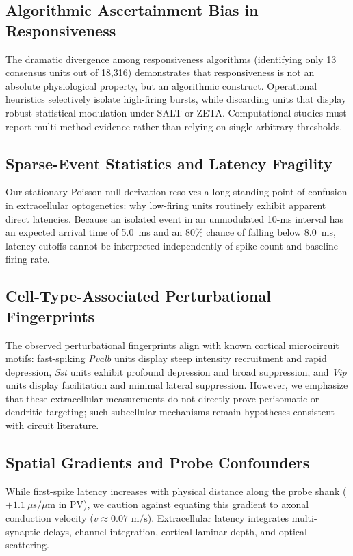 \documentclass[10pt,journal,compsoc]{IEEEtran}
\begin{document}
\subsection{Algorithmic Ascertainment Bias in Responsiveness}
The dramatic divergence among responsiveness algorithms (identifying only 13 consensus units out of 18,316) demonstrates that responsiveness is not an absolute physiological property, but an algorithmic construct. Operational heuristics selectively isolate high-firing bursts, while discarding units that display robust statistical modulation under SALT or ZETA. Computational studies must report multi-method evidence rather than relying on single arbitrary thresholds.

\subsection{Sparse-Event Statistics and Latency Fragility}
Our stationary Poisson null derivation resolves a long-standing point of confusion in extracellular optogenetics: why low-firing units routinely exhibit apparent direct latencies. Because an isolated event in an unmodulated 10-ms interval has an expected arrival time of 5.0~ms and an 80\% chance of falling below 8.0~ms, latency cutoffs cannot be interpreted independently of spike count and baseline firing rate.

\subsection{Cell-Type-Associated Perturbational Fingerprints}
The observed perturbational fingerprints align with known cortical microcircuit motifs: fast-spiking \textit{Pvalb} units display steep intensity recruitment and rapid depression, \textit{Sst} units exhibit profound depression and broad suppression, and \textit{Vip} units display facilitation and minimal lateral suppression. However, we emphasize that these extracellular measurements do not directly prove perisomatic or dendritic targeting; such subcellular mechanisms remain hypotheses consistent with circuit literature.

\subsection{Spatial Gradients and Probe Confounders}
While first-spike latency increases with physical distance along the probe shank ($+1.1\ \mu\text{s}/\mu\text{m}$ in PV), we caution against equating this gradient to axonal conduction velocity ($v \approx 0.07\text{ m/s}$). Extracellular latency integrates multi-synaptic delays, channel integration, cortical laminar depth, and optical scattering.
\end{document}
